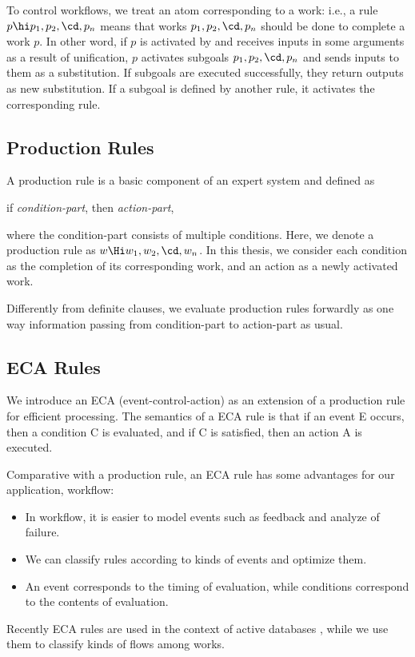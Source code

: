 To control workflows, we treat an atom corresponding to a work: i.e., a rule
$p\hi p_1,p_2,\cd,p_n$ means that works $p_1,p_2,\cd,p_n$ should be
done to complete a work $p$.  In other word, if $p$ is activated by
and receives inputs in some arguments as a result of unification, $p$
activates subgoals $p_1,p_2,\cd,p_n$ and sends inputs to them as a
substitution.  If subgoals are executed successfully, they return
outputs as new substitution.  If a subgoal is defined by another rule,
it activates the corresponding rule. 

\subsection{Production Rules}

A production rule is a basic component of an expert system and 
defined as 
\begin{center}
if {\em condition-part}, then {\em action-part},
\end{center}
where the condition-part consists of multiple conditions.
Here, we denote a production rule as $w\Hi w_1,w_2,\cd,w_n$.
In this thesis, we consider each condition as the completion of its 
corresponding work, and an action as a newly activated work.

Differently from definite clauses, we evaluate production rules
forwardly as one way information passing from condition-part to
action-part as usual.

\subsection{ECA Rules}

We introduce an ECA (event-control-action) as an extension of a production
rule for efficient processing.
The semantics of a ECA rule is that if an event E occurs, then a
condition C is evaluated, and if C is satisfied, then an action A is
executed.

Comparative with a production rule, an ECA rule has some advantages
for our application, workflow:
\begin{itemize}\itemsep0mm\parskip0mm
\item In workflow, it is easier to model events such as feedback and
analyze of failure.
\item We can classify rules according to kinds of events and
optimize them.
\item An event corresponds to the timing of evaluation, while
conditions correspond to the contents of evaluation.
\end{itemize}
 Recently ECA rules are used in the context of active
databases \cite{mccarthy:sigmod89}, while
we use them to classify kinds of flows among works.

